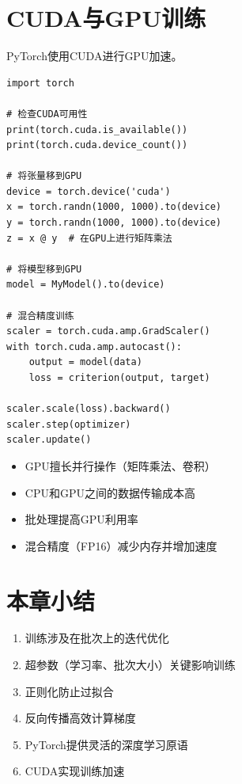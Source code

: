 \section{CUDA与GPU训练}

PyTorch使用CUDA进行GPU加速。

\begin{code}
    \label{code:cuda_chinese}
\begin{verbatim}
import torch

# 检查CUDA可用性
print(torch.cuda.is_available())
print(torch.cuda.device_count())

# 将张量移到GPU
device = torch.device('cuda')
x = torch.randn(1000, 1000).to(device)
y = torch.randn(1000, 1000).to(device)
z = x @ y  # 在GPU上进行矩阵乘法

# 将模型移到GPU
model = MyModel().to(device)

# 混合精度训练
scaler = torch.cuda.amp.GradScaler()
with torch.cuda.amp.autocast():
    output = model(data)
    loss = criterion(output, target)

scaler.scale(loss).backward()
scaler.step(optimizer)
scaler.update()
\end{verbatim}
\end{code}

\begin{properties}[CUDA原理]
\begin{itemize}
    \item GPU擅长并行操作（矩阵乘法、卷积）
    \item CPU和GPU之间的数据传输成本高
    \item 批处理提高GPU利用率
    \item 混合精度（FP16）减少内存并增加速度
\end{itemize}
\end{properties}

\section{本章小结}

\begin{enumerate}
    \item 训练涉及在批次上的迭代优化
    \item 超参数（学习率、批次大小）关键影响训练
    \item 正则化防止过拟合
    \item 反向传播高效计算梯度
    \item PyTorch提供灵活的深度学习原语
    \item CUDA实现训练加速
\end{enumerate}
